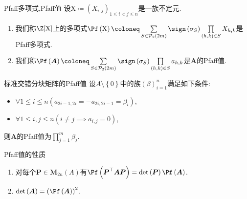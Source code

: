 \begin{definition}{Pfaff多项式,Pfaff值}{}
	设$\mathrm{X}\coloneq\left(X_{i,j}\right)_{1\leq i<j\leq n}$是一族不定元.
	\begin{enumerate}
		\item 我们称$\Z[\mathrm{X}]$上的多项式$\Pf\left(\mathrm{X}\right)\coloneq\sum\limits_{S\in\mathcal{P}_{2}\left(2m\right)}\sign\left(\sigma_{S}\right)\prod\limits_{\left(h,k\right)\in S}X_{h,k}$是Pfaff多项式.
		\item 我们称$\Pf\left(\boldsymbol{A}\right)\coloneq\sum\limits_{S\in\mathcal{P}_{2}\left(2m\right)}\sign\left(\sigma_{S}\right)\prod\limits_{\left(h,k\right)\in S}a_{h,k}$是$\boldsymbol{A}$的Pfaff值.
	\end{enumerate}
\end{definition}

\begin{example}{标准交错分块矩阵的Pfaff值}{}
	设$A\setminus\left\{0\right\}$中的族$\left(\beta\right)_{i=1}^{n}$满足如下条件:
	\begin{itemize}
		\item $\forall 1\leq i\leq n\left(a_{2i-1,2i}=-a_{2i,2i-1}=\beta_{i}\right)$,
		\item $\forall 1\leq i,j\leq n\left(i\neq j\implies a_{i,j}=0\right)$,
	\end{itemize}
	则$\boldsymbol{A}$的Pfaff值为$\prod\limits_{j=1}^{m}\beta_{j}$.
\end{example}

\begin{proposition}{Pfaff值的性质}{}
	\begin{enumerate}
		\item 对每个$\boldsymbol{P}\in\mathbf{M}_{2n}\left(A\right)$有$\Pf\left(\boldsymbol{P}^{\top}\boldsymbol{A}\boldsymbol{P}\right)=\det\left(\boldsymbol{P}\right)\Pf\left(\boldsymbol{A}\right)$.
		\item $\det\left(\boldsymbol{A}\right)=\left(\Pf\left(\boldsymbol{A}\right)\right)^{2}$.
	\end{enumerate}
\end{proposition}
